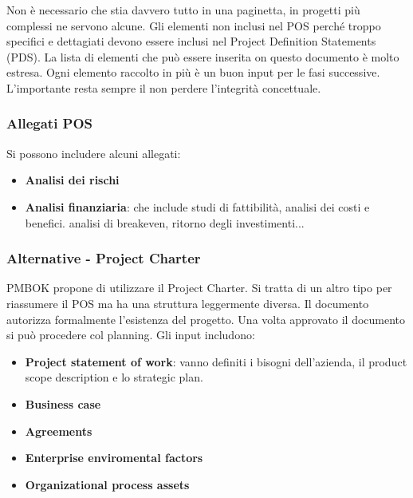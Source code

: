 \noindent Non è necessario che stia davvero tutto in una paginetta, in progetti più complessi ne servono alcune. Gli elementi non inclusi nel POS perché troppo specifici e dettagiati devono essere inclusi nel Project Definition Statements (PDS). La lista di elementi che può essere inserita on questo documento è molto estresa. Ogni elemento raccolto in più è un buon input per le fasi successive. L'importante resta sempre il non perdere l'integrità concettuale.
\subsubsection{Allegati POS}
Si possono includere alcuni allegati:
\begin{itemize}
	\item \textbf{Analisi dei rischi}
	\item \textbf{Analisi finanziaria}: che include studi di fattibilità, analisi dei costi e benefici. analisi di breakeven, ritorno degli investimenti...
\end{itemize}

\subsubsection{Alternative - Project Charter}
PMBOK propone di utilizzare il Project Charter. Si tratta di un altro tipo per riassumere il POS ma ha una struttura leggermente diversa. Il documento autorizza formalmente l'esistenza del progetto. Una volta approvato il documento si può procedere col planning. Gli input includono:
\begin{itemize}
	\item \textbf{Project statement of work}: vanno definiti i bisogni dell'azienda, il product scope description e lo strategic plan.
	\item \textbf{Business case}
	\item \textbf{Agreements}
	\item \textbf{Enterprise enviromental factors}
	\item \textbf{Organizational process assets}
\end{itemize}

\newpage